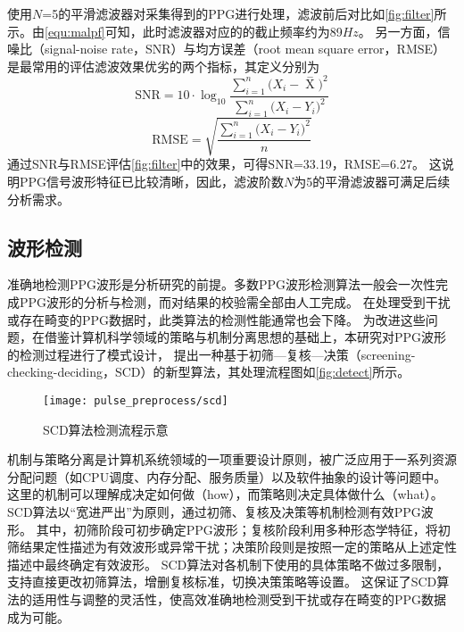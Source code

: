 使用$N$=5的平滑滤波器对采集得到的PPG进行处理，滤波前后对比如\autoref{fig:filter}所示。由\autoref{equ:malpf}可知，此时滤波器对应的的截止频率约为89$Hz$。
另一方面，信噪比（signal-noise rate，SNR）与均方误差（root mean square error，RMSE）是最常用的评估滤波效果优劣的两个指标，其定义分别为
\begin{equation}
    \label{equ:snr}
    \text{SNR}=10 \cdot \log_{10}\frac{\sum_{i=1}^{n}{(X_i-\mathop{X} \limits^-})^2}{\sum_{i=1}^{n}{(X_i-Y_i})^2}
\end{equation}
\begin{equation}
    \label{equ:rmse}
    \text{RMSE}=\sqrt{\frac{\sum_{i=1}^{n}{(X_i-Y_i})^2}{n}}
\end{equation}
通过SNR与RMSE评估\autoref{fig:filter}中的效果，可得$\text{SNR}$=33.19，$\text{RMSE}$=6.27。
这说明PPG信号波形特征已比较清晰，因此，滤波阶数$N$为5的平滑滤波器可满足后续分析需求。

\subsection{波形检测}
准确地检测PPG波形是分析研究的前提。多数PPG波形检测算法一般会一次性完成PPG波形的分析与检测，而对结果的校验需全部由人工完成\cite{Zhang2010,Chen2021,Allen2007,Feng2018,FengJiang2018}。
在处理受到干扰或存在畸变的PPG数据时，此类算法的检测性能通常也会下降。
为改进这些问题，在借鉴计算机科学领域的策略与机制分离思想的基础上\cite{Levin1975}，本研究对PPG波形的检测过程进行了模式设计，
提出一种基于初筛—复核—决策（screening-checking-deciding，SCD）的新型算法，其处理流程图如\autoref{fig:detect}所示。

\begin{figure}[htbp]
    \centering
    \texttt{[image: pulse\_preprocess/scd]}
    \caption{\label{fig:detect}SCD算法检测流程示意}
\end{figure}

机制与策略分离是计算机系统领域的一项重要设计原则，被广泛应用于一系列资源分配问题（如CPU调度、内存分配、服务质量）以及软件抽象的设计等问题中\cite{Wulf1974,Levin1975,Brinch2001}。
这里的机制可以理解成决定如何做（how），而策略则决定具体做什么（what）。
SCD算法以“宽进严出”为原则，通过初筛、复核及决策等机制检测有效PPG波形。
其中，初筛阶段可初步确定PPG波形；复核阶段利用多种形态学特征，将初筛结果定性描述为有效波形或异常干扰；决策阶段则是按照一定的策略从上述定性描述中最终确定有效波形。
SCD算法对各机制下使用的具体策略不做过多限制，支持直接更改初筛算法，增删复核标准，切换决策策略等设置。
这保证了SCD算法的适用性与调整的灵活性，使高效准确地检测受到干扰或存在畸变的PPG数据成为可能。

